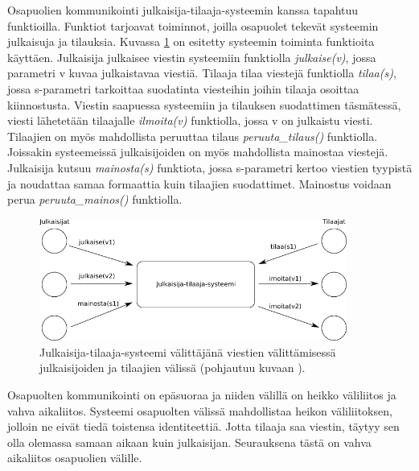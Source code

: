 Osapuolien kommunikointi julkaisija-tilaaja-systeemin kanssa tapahtuu funktioilla. Funktiot tarjoavat toiminnot, joilla osapuolet tekevät systeemin julkaisuja ja tilauksia. Kuvassa \ref{fig:publish-subscribe-communication} on esitetty systeemin toiminta funktioita käyttäen. Julkaisija julkaisee viestin systeemiin funktiolla \emph{julkaise(v)}, jossa parametri v kuvaa julkaistavaa viestiä. Tilaaja tilaa viestejä funktiolla \emph{tilaa(s)}, jossa s-parametri tarkoittaa suodatinta viesteihin joihin tilaaja osoittaa kiinnostusta. Viestin saapuessa systeemiin ja tilauksen suodattimen täsmätessä, viesti lähetetään tilaajalle \emph{ilmoita(v)} funktiolla, jossa v on julkaistu viesti. Tilaajien on myös mahdollista peruuttaa tilaus \emph{peruuta\_tilaus()} funktiolla. Joissakin systeemeissä julkaisijoiden on myös mahdollista mainostaa viestejä. Julkaisija kutsuu \emph{mainosta(s)} funktiota, jossa s-parametri kertoo viestien tyypistä ja noudattaa samaa formaattia kuin tilaajien suodattimet. Mainostus voidaan perua \emph{peruuta\_mainos()} funktiolla. \mbox{\cite[s.~2--3]{baldoni2005distributed}} \mbox{\cite[s.~26--28]{distributed-event-based-systems}}

\begin{figure}[ht!]
	\includegraphics[width=0.9\textwidth]{pictures/publish-subscribe.png}
	\caption{Julkaisija-tilaaja-systeemi välittäjänä viestien välittämisessä julkaisijoiden ja tilaajien välissä (pohjautuu kuvaan \mbox{\cite[s.~246]{distributed-systems-concepts-and-design}}).}
	\label{fig:publish-subscribe-communication}
\end{figure}

Osapuolten kommunikointi on epäsuoraa ja niiden välillä on heikko väliliitos ja vahva aikaliitos. Systeemi osapuolten välissä mahdollistaa heikon väliliitoksen, jolloin ne eivät tiedä toistensa identiteettiä. Jotta tilaaja saa viestin, täytyy sen olla olemassa samaan aikaan kuin julkaisijan. Seurauksena tästä on vahva aikaliitos osapuolien välille. 


